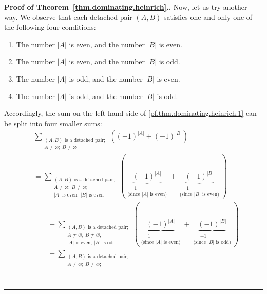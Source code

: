 \documentclass[numbers=enddot,12pt,final,onecolumn,notitlepage]{scrartcl}%
\theoremstyle{definition}
\newenvironment{proof}[1][Proof]{\noindent\textbf{#1.} }{\ \rule{0.5em}{0.5em}}
\let\sumnonlimits\sum
\renewcommand{\sum}{\sumnonlimits\limits}
\newcommand{\abs}[1]{\left| #1 \right|}
\newcommand{\tup}[1]{\left( #1 \right)}
\begin{document}
\begin{proof}[Proof of Theorem~\ref{thm.dominating.heinrich}.]
Now, let us try another way. We observe that each detached pair
$\tup{A, B}$ satisfies one and only one of the following four
conditions:
\begin{enumerate}
\item The number $\abs{A}$ is even, and the number $\abs{B}$ is even.
\item The number $\abs{A}$ is even, and the number $\abs{B}$ is odd.
\item The number $\abs{A}$ is odd, and the number $\abs{B}$ is even.
\item The number $\abs{A}$ is odd, and the number $\abs{B}$ is odd.
\end{enumerate}
Accordingly, the sum on the left hand side of
\eqref{pf.thm.dominating.heinrich.1} can be split into four smaller
sums:
\begin{align*}
& \sum_{\substack{\tup{A, B} \text{ is a detached pair}; \\
                A \neq \varnothing; \  B \neq \varnothing}}
  \tup{\tup{-1}^{\abs{A}} + \tup{-1}^{\abs{B}}}
  \\
&= \sum_{\substack{\tup{A, B} \text{ is a detached pair}; \\
                A \neq \varnothing; \  B \neq \varnothing ; \\
                \abs{A} \text{ is even};
                \ \abs{B} \text{ is even}}}
  \tup{\underbrace{\tup{-1}^{\abs{A}}}_{\substack{= 1 \\
               \text{(since } \abs{A} \text{ is even)}}}
       + \underbrace{\tup{-1}^{\abs{B}}}_{\substack{= 1 \\
               \text{(since } \abs{B} \text{ is even)}}}} \\
& \qquad +  \sum_{\substack{\tup{A, B} \text{ is a detached pair}; \\
                A \neq \varnothing; \  B \neq \varnothing ; \\
                \abs{A} \text{ is even};
                \ \abs{B} \text{ is odd}}}
  \tup{\underbrace{\tup{-1}^{\abs{A}}}_{\substack{= 1 \\
               \text{(since } \abs{A} \text{ is even)}}}
       + \underbrace{\tup{-1}^{\abs{B}}}_{\substack{= -1 \\
               \text{(since } \abs{B} \text{ is odd)}}}} \\
& \qquad +  \sum_{\substack{\tup{A, B} \text{ is a detached pair}; \\
                A \neq \varnothing; \  B \neq \varnothing ; \\
}}
\end{align*}
\end{proof}
\end{document}
